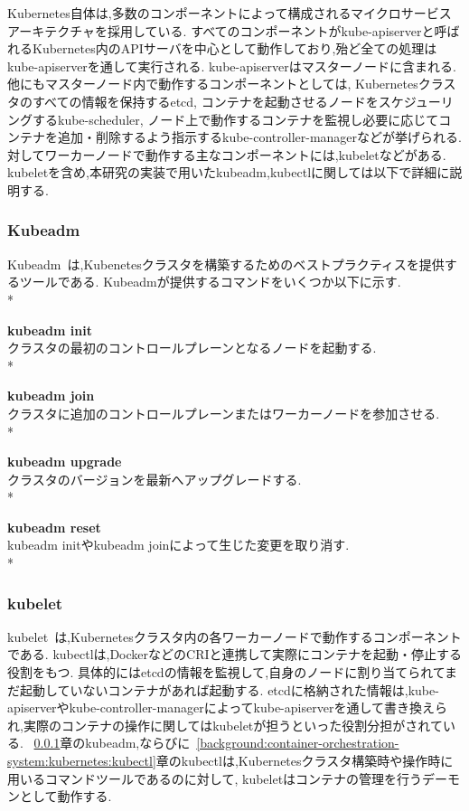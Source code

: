 Kubernetes自体は,多数のコンポーネントによって構成されるマイクロサービスアーキテクチャを採用している.
すべてのコンポーネントがkube-apiserverと呼ばれるKubernetes内のAPIサーバを中心として動作しており,殆ど全ての処理はkube-apiserverを通して実行される.
kube-apiserverはマスターノードに含まれる.
他にもマスターノード内で動作するコンポーネントとしては,
Kubernetesクラスタのすべての情報を保持するetcd,
コンテナを起動させるノードをスケジューリングするkube-scheduler,
ノード上で動作するコンテナを監視し必要に応じてコンテナを追加・削除するよう指示するkube-controller-managerなどが挙げられる.
対してワーカーノードで動作する主なコンポーネントには,kubeletなどがある.
kubeletを含め,本研究の実装で用いたkubeadm,kubectlに関しては以下で詳細に説明する.

\subsubsection{Kubeadm}
\label{background:container-orchestration-system:kubernetes:kubeadm}

Kubeadm~\cite{Kubeadm}は,Kubenetesクラスタを構築するためのベストプラクティスを提供するツールである.
Kubeadmが提供するコマンドをいくつか以下に示す.\\*

{\bf kubeadm init}\\
クラスタの最初のコントロールプレーンとなるノードを起動する.\\*

{\bf kubeadm join}\\
クラスタに追加のコントロールプレーンまたはワーカーノードを参加させる.\\*

{\bf kubeadm upgrade}\\
クラスタのバージョンを最新へアップグレードする.\\*

{\bf kubeadm reset}\\
kubeadm initやkubeadm joinによって生じた変更を取り消す.\\*

\subsubsection{kubelet}
\label{background:container-orchestration-system:kubernetes:kubelet}

kubelet~\cite{kubelet}は,Kubernetesクラスタ内の各ワーカーノードで動作するコンポーネントである.
kubectlは,DockerなどのCRIと連携して実際にコンテナを起動・停止する役割をもつ.
具体的にはetcdの情報を監視して,自身のノードに割り当てられてまだ起動していないコンテナがあれば起動する.
etcdに格納された情報は,kube-apiserverやkube-controller-managerによってkube-apiserverを通して書き換えられ,実際のコンテナの操作に関してはkubeletが担うといった役割分担がされている.
~\ref{background:container-orchestration-system:kubernetes:kubeadm}章のkubeadm,ならびに~\ref{background:container-orchestration-system:kubernetes:kubectl}章のkubectlは,Kubernetesクラスタ構築時や操作時に用いるコマンドツールであるのに対して,
kubeletはコンテナの管理を行うデーモンとして動作する.

